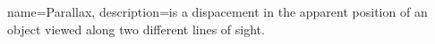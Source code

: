 {
  name=Parallax,
  description={is a dispacement in the apparent position of an object viewed along two different lines of sight.}
}
